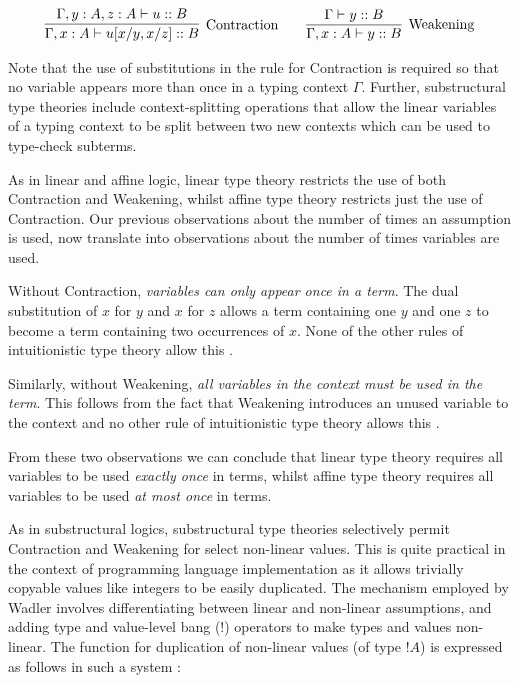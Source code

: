 \documentclass[]{unswthesis}
\begin{document}
\begin{eqnarray*}
\infer[\text{Contraction}]{\Gamma, x : A \vdash u[x/y, x/z] :: B}{
	\Gamma, y : A, z : A \vdash u :: B
}
\qquad
\infer[\text{Weakening}]{\Gamma, x : A \vdash y :: B}{
    \Gamma\vdash y :: B
}
\end{eqnarray*}

Note that the use of substitutions in the rule for Contraction is required so that no variable appears more than once in a typing context $\Gamma$. Further, substructural type theories include context-splitting operations that allow the linear variables of a typing context to be split between two new contexts which can be used to type-check subterms.

As in linear and affine logic, linear type theory restricts the use of both Contraction and Weakening, whilst affine type theory restricts just the use of Contraction. Our previous observations about the number of times an assumption is used, now translate into observations about the number of times variables are used.

Without Contraction, \textit{variables can only appear once in a term}. The dual substitution of $x$ for $y$ and $x$ for $z$ allows a term containing one $y$ and one $z$ to become a term containing two occurrences of $x$. None of the other rules of intuitionistic type theory allow this \cite{wadler93}.

Similarly, without Weakening, \textit{all variables in the context must be used in the term}. This follows from the fact that Weakening introduces an unused variable to the context and no other rule of intuitionistic type theory allows this \cite{wadler93}.

From these two observations we can conclude that linear type theory requires all variables to be used \textit{exactly once} in terms, whilst affine type theory requires all variables to be used \textit{at most once} in terms.

As in substructural logics, substructural type theories selectively permit Contraction and Weakening for select non-linear values. This is quite practical in the context of programming language implementation as it allows trivially copyable values like integers to be easily duplicated. The mechanism employed by Wadler \cite{wadler93} involves differentiating between linear and non-linear assumptions, and adding type and value-level bang (!) operators to make types and values non-linear. The function for duplication of non-linear values (of type $!A$) is expressed as follows in such a system :
\end{document}
